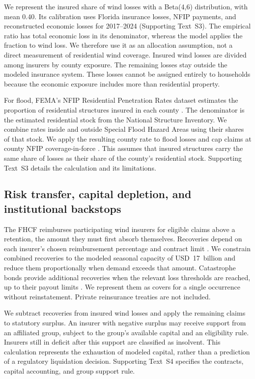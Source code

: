 We represent the insured share of wind losses with a Beta(4,6) distribution, with mean 0.40. Its calibration uses Florida insurance losses, NFIP payments, and reconstructed economic losses for 2017--2024 (Supporting Text~S3). The empirical ratio has total economic loss in its denominator, whereas the model applies the fraction to wind loss. We therefore use it as an allocation assumption, not a direct measurement of residential wind coverage. Insured wind losses are divided among insurers by county exposure. The remaining losses stay outside the modeled insurance system. These losses cannot be assigned entirely to households because the economic exposure includes more than residential property.

For flood, FEMA's NFIP Residential Penetration Rates dataset estimates the proportion of residential structures insured in each county \cite{fema_nfip_penetration_2025}. The denominator is the estimated residential stock from the National Structure Inventory. We combine rates inside and outside Special Flood Hazard Areas using their shares of that stock. We apply the resulting county rate to flood losses and cap claims at county NFIP coverage-in-force \cite{fema_nfip_redacted_policies_v2_2024}. This assumes that insured structures carry the same share of losses as their share of the county's residential stock. Supporting Text~S3 details the calculation and its limitations.

\subsection{Risk transfer, capital depletion, and institutional backstops}\label{MethodsRiskProp}\label{MethodsRiskTransferCapital}
The FHCF reimburses participating wind insurers for eligible claims above a retention, the amount they must first absorb themselves. Recoveries depend on each insurer's chosen reimbursement percentage and contract limit \cite{fhcf_annual_report_2023,fhcf_coverage_2024}. We constrain combined recoveries to the modeled seasonal capacity of USD~17~billion and reduce them proportionally when demand exceeds that amount. Catastrophe bonds provide additional recoveries when the relevant loss thresholds are reached, up to their payout limits \cite{artemis_catbond_2024}. We represent them as covers for a single occurrence without reinstatement. Private reinsurance treaties are not included.

We subtract recoveries from insured wind losses and apply the remaining claims to statutory surplus. An insurer with negative surplus may receive support from an affiliated group, subject to the group's available capital and an eligibility rule. Insurers still in deficit after this support are classified as insolvent. This calculation represents the exhaustion of modeled capital, rather than a prediction of a regulatory liquidation decision. Supporting Text~S4 specifies the contracts, capital accounting, and group support rule.

